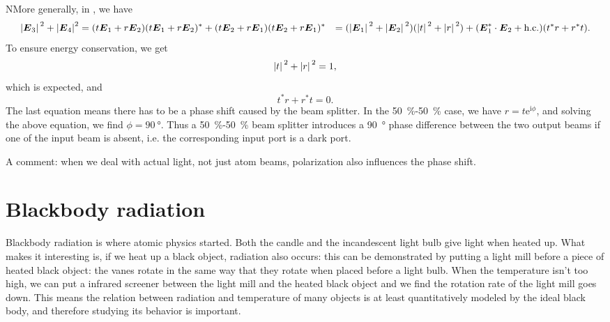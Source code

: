 \documentclass[hyperref, a4paper]{article}
\newcommand*{\ii}{\mathrm{i}}
\newcommand*{\ee}{\mathrm{e}}
\def\\{}%
\begin{document}
NMore generally, in , we have 
\begin{equation}
    \begin{aligned}
        \abs*{\vb*{E}_3}^2 + \abs{\vb*{E}_4}^2 &= 
        (t \vb*{E}_1 + r \vb*{E}_2) (t \vb*{E}_1 + r \vb*{E}_2)^*
        + (t \vb*{E}_2 + r \vb*{E}_1) (t \vb*{E}_2 + r \vb*{E}_1)^* \\
        &= (\abs*{\vb*{E}_1}^2 + \abs*{\vb*{E}_2}^2) (\abs*{t}^2 + \abs*{r}^2)
        + (\vb*{E}_1^* \cdot \vb*{E}_2 + \text{h.c.}) (t^* r + r^* t).
    \end{aligned}
\end{equation}
To ensure energy conservation, we get 
\begin{equation}
    \abs*{t}^2 + \abs*{r}^2 = 1,
\end{equation}
which is expected, and 
\begin{equation}
    t^* r + r^* t = 0.
\end{equation}
The last equation means there has to be a phase shift caused by the beam splitter. 
In the \SI{50}{\percent}-\SI{50}{\percent} case, 
we have $r = t \ee^{\ii \phi}$,
and solving the above equation, 
we find $\phi = \SI{90}{\degree}$.
Thus a \SI{50}{\percent}-\SI{50}{\percent} beam splitter introduces a \SI{90}{\degree} phase difference 
between the two output beams 
if one of the input beam is absent, 
i.e. the corresponding input port is a dark port.

A comment: when we deal with actual light,
not just atom beams, 
polarization also influences the phase shift.

\section{Blackbody radiation}

Blackbody radiation is where atomic physics started.
Both the candle and the incandescent light bulb
give light when heated up.
What makes it interesting is,
if we heat up a black object, 
radiation also occurs:
this can be demonstrated by 
putting a light mill before a piece of heated black object:
the vanes rotate in the same way that 
they rotate when placed before a light bulb.
When the temperature isn't too high,
we can put a infrared screener between the light mill and the heated black object
and we find the rotation rate of the light mill goes down.
This means the relation between radiation and temperature of many objects 
is at least quantitatively modeled by the ideal black body,
and therefore studying its behavior is important.
\end{document}
